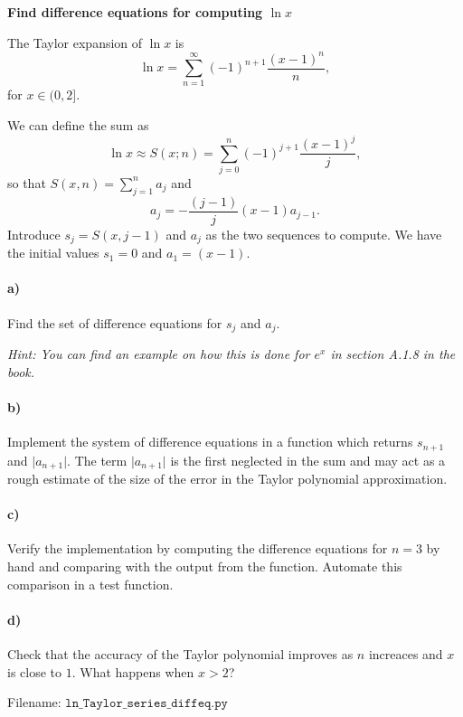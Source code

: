\begin{Problem}{\textbf{Find difference equations for computing $\ln x$}}
  
\noindent 
The Taylor expansion of $\ln x$ is
\begin{equation*}
\ln x = \sum_{n = 1}^\infty (-1)^{n + 1}\frac{(x - 1)^ n}{n},
\end{equation*}
for $x \in (0, 2]$.

We can define the sum as
\begin{equation*}
\ln x \approx S(x; n) = \sum_{j = 0}^n (-1)^{j + 1}\frac{(x - 1)^ j}{j},
\end{equation*}
so that $S(x, n) = \sum_{j = 1}^n a_j$ and 
\begin{equation*}
a_j = -\frac{(j-1)}{j}(x - 1)a_{j-1}.
\end{equation*}
Introduce $s_j = S(x, j - 1)$ and $a_j$ as the two sequences to compute. We have
the initial values $s_1 = 0$ and $a_1 = (x - 1)$.

\paragraph{a)}
Find the set of difference equations for $s_j$ and $a_j$.

\emph{Hint: You can find an example on how this is done for $e^x$ in
section A.1.8 in the book.}

\paragraph{b)}
Implement the system of difference equations in a function
 which returns $s_{n + 1}$ and $\lvert a_{n+1}\rvert$.
The term $\lvert a_{n+1}\rvert$ is the first neglected in the sum and may act as a
rough estimate of the size of the error in the Taylor polynomial approximation.

\paragraph{c)}
Verify the implementation by computing the difference equations
for $n = 3$ by hand and comparing with the output from the 
function. Automate this comparison in a test function.

\paragraph{d)}
Check that the accuracy of the Taylor polynomial improves as $n$
increaces and $x$ is close to $1$. What happens when $x > 2$?

Filename: $\texttt{ln\_Taylor\_series\_diffeq.py}$
\end{Problem}

